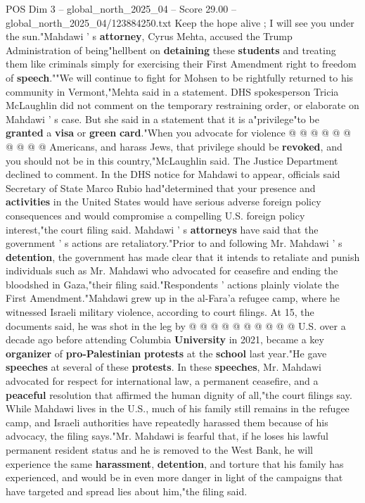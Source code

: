 \begin{textsample}{POS Dim 3 – global\_north\_2025\_04 – Score 29.00 – global\_north\_2025\_04/123884250.txt}
Keep the hope alive ; I will see you under the sun."Mahdawi ' s \textbf{attorney}, Cyrus Mehta, accused the Trump Administration of being"hellbent on \textbf{detaining} these \textbf{students} and treating them like criminals simply for exercising their First Amendment right to freedom of \textbf{speech}.""We will continue to fight for Mohsen to be rightfully returned to his community in Vermont,"Mehta said in a statement.
DHS spokesperson Tricia McLaughlin did not comment on the temporary restraining order, or elaborate on Mahdawi ' s case.
But she said in a statement that it is a"privilege"to be \textbf{granted} a \textbf{visa} or \textbf{green} \textbf{card}."When you advocate for violence @ @ @ @ @ @ @ @ @ @ Americans, and harass Jews, that privilege should be \textbf{revoked}, and you should not be in this country,"McLaughlin said.
The Justice Department declined to comment.
In the DHS notice for Mahdawi to appear, officials said Secretary of State Marco Rubio had"determined that your presence and \textbf{activities} in the United States would have serious adverse foreign policy consequences and would compromise a compelling U.S. foreign policy interest,"the court filing said.
Mahdawi ' s \textbf{attorneys} have said that the government ' s actions are retaliatory."Prior to and following Mr.
Mahdawi ' s \textbf{detention}, the government has made clear that it intends to retaliate and punish individuals such as Mr.
Mahdawi who advocated for ceasefire and ending the bloodshed in Gaza,"their filing said."Respondents ' actions plainly violate the First Amendment."Mahdawi grew up in the al-Fara'a refugee camp, where he witnessed Israeli military violence, according to court filings.
At 15, the documents said, he was shot in the leg by @ @ @ @ @ @ @ @ @ @ U.S. over a decade ago before attending Columbia \textbf{University} in 2021, became a key \textbf{organizer} of \textbf{pro-Palestinian} \textbf{protests} at the \textbf{school} last year."He gave \textbf{speeches} at several of these \textbf{protests}.
In these \textbf{speeches}, Mr.
Mahdawi advocated for respect for international law, a permanent ceasefire, and a \textbf{peaceful} resolution that affirmed the human dignity of all,"the court filings say.
While Mahdawi lives in the U.S., much of his family still remains in the refugee camp, and Israeli authorities have repeatedly harassed them because of his advocacy, the filing says."Mr.
Mahdawi is fearful that, if he loses his lawful permanent resident status and he is removed to the West Bank, he will experience the same \textbf{harassment}, \textbf{detention}, and torture that his family has experienced, and would be in even more danger in light of the campaigns that have targeted and spread lies about him,"the filing said.

\end{textsample}
